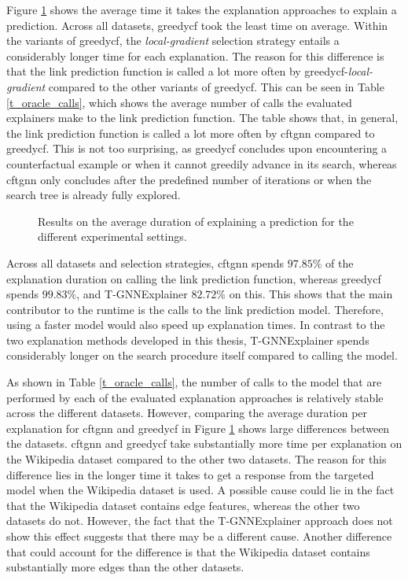 Figure \ref{f_duration} shows the average time it takes the explanation approaches to explain a prediction. Across all datasets, \gls{greedycf} took the least time on average. Within the variants of \gls{greedycf}, the \textit{local-gradient} selection strategy entails a considerably longer time for each explanation. The reason for this difference is that the link prediction function is called a lot more often by \gls{greedycf}-\textit{local-gradient} compared to the other variants of \gls{greedycf}. This can be seen in Table \ref{t_oracle_calls}, which shows the average number of calls the evaluated explainers make to the link prediction function. The table shows that, in general, the link prediction function is called a lot more often by \gls{cftgnn} compared to \gls{greedycf}. This is not too surprising, as \gls{greedycf} concludes upon encountering a counterfactual example or when it cannot greedily advance in its search, whereas \gls{cftgnn} only concludes after the predefined number of iterations or when the search tree is already fully explored.

\begin{figure}
    \centering
    
    \caption{Results on the average duration of explaining a prediction for the different experimental settings.}
    \label{f_duration}
\end{figure}


Across all datasets and selection strategies, \gls{cftgnn} spends $97.85\%$ of the explanation duration on calling the link prediction function, whereas \gls{greedycf} spends $99.83\%$, and T-GNNExplainer $82.72\%$ on this. This shows that the main contributor to the runtime is the calls to the link prediction model. Therefore, using a faster model would also speed up explanation times. In contrast to the two explanation methods developed in this thesis, T-GNNExplainer spends considerably longer on the search procedure itself compared to calling the model.

As shown in Table \ref{t_oracle_calls}, the number of calls to the model that are performed by each of the evaluated explanation approaches is relatively stable across the different datasets. However, comparing the average duration per explanation for \gls{cftgnn} and \gls{greedycf} in Figure \ref{f_duration} shows large differences between the datasets. \gls{cftgnn} and \gls{greedycf} take substantially more time per explanation on the Wikipedia dataset compared to the other two datasets.
The reason for this difference lies in the longer time it takes to get a response from the targeted model when the Wikipedia dataset is used. A possible cause could lie in the fact that the Wikipedia dataset contains edge features, whereas the other two datasets do not. However, the fact that the T-GNNExplainer approach does not show this effect suggests that there may be a different cause. Another difference that could account for the difference is that the Wikipedia dataset contains substantially more edges than the other datasets.

